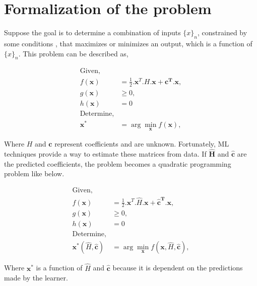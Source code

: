\documentclass[12pt, letterpaper]{article}
\begin{document}
\section{Formalization of the problem}
\label{sec: formalization}
Suppose the goal is to determine a combination of inputs $\{x\}_n$, constrained
by some conditions , that maximizes or minimizes an output, which is a function
of $\{x\}_n$. This problem can be described as,



\begin{align}
    \text{Given,}  & \\
    f(\mathbf{x}) &= \frac{1}{2}.\mathbf{x}^T.H.\mathbf{x} + \mathbf{c^T.x}, \\
    g(\mathbf{x}) &\geq 0, \\
    h(\mathbf{x}) &= 0 \\
    \text{Determine,} & \\
    \mathbf{x}^* &= \arg \min_{\mathbf{x}} f(\mathbf{x}),
\end{align}

Where $H$ and $\mathbf{c}$ represent coefficients and are unknown. Fortunately,
ML techniques provide a way to estimate these matrices from data. If
$\mathbf{\hat{H}}$ and $\hat{\mathbf{c}}$ are the predicted coefficients, the
problem becomes a quadratic programming problem like below.

\begin{align}
    \text{Given,}  & \\
    f(\mathbf{x}) &= \frac{1}{2}.\mathbf{x}^T.\hat{H}.\mathbf{x} + \mathbf{\hat{c}^T.x}, \\
    g(\mathbf{x}) &\geq 0, \\
    h(\mathbf{x}) &= 0 \\
    \text{Determine,} & \\
    \mathbf{x}^*(\hat{H}, \hat{\mathbf{c}}) &= \arg \min_{\mathbf{x}} f(\mathbf{x}, \hat{H}, \hat{\mathbf{c}}),
\end{align}

Where $\mathbf{x}^*$ is a function of $\hat{H}$ and $\hat{\mathbf{c}}$ because
it is dependent on the predictions made by the learner. 
\end{document}
